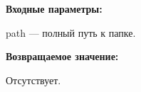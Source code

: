 \textbf{Входные параметры:}

path --- полный путь к папке.

\textbf{Возвращаемое значение:}

Отсутствует.